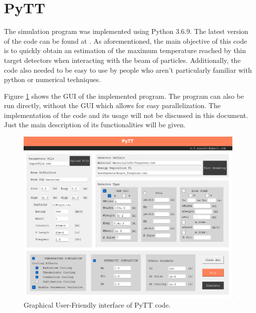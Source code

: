 \section{PyTT}

The simulation program was implemented using Python 3.6.9. The latest version of the code can be found at \parencite[][]{ref:GitAra}. As aforementioned, the main objective of this code is to quickly obtain an estimation of the maximum temperature reached by thin target detectors when interacting with the beam of particles. Additionally, the code also needed to be easy to use by people who aren't particularly familiar with python or numerical techniques.

Figure \ref{fig:UserFriendly} shows the GUI of the implemented program. The program can also be run directly, without the GUI which allows for easy parallelization. The implementation of the code and its usage will not be discussed in this document. Just the main description of its functionalities will be given. 

\begin{figure}[h]
    \centering
    \includegraphics[width=0.9\columnwidth]{PyTT_GUI/PyTTScreanshot.png}
    \caption{Graphical User-Friendly interface of PyTT code.}
    \label{fig:UserFriendly}
\end{figure}

